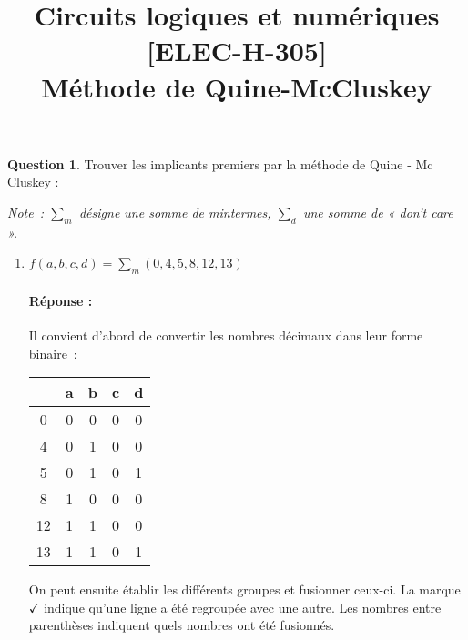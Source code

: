 \documentclass[11pt,a4paper]{article}
\date{}
\title{\vspace{-2cm}Circuits logiques et numériques [ELEC-H-305] \\  \tpnumber Méthode de Quine-McCluskey \ifthenelse{\boolean{corrige}}{-- Corrigé}{} \\ \small{\version}}
\theoremstyle{definition}%
\newtheorem{Q}{Question}[] %
\newcommand{\reponse}[1]{%
	\ifthenelse {\boolean{corrige}} {\paragraph{Réponse :} \color{darkblue}   #1\color{black}} {}
 }
\begin{document}
\maketitle
\vspace*{-1cm}




\begin{Q}
Trouver les implicants premiers par la méthode de Quine - Mc Cluskey :

\textit{Note~: $\sum_m$ désigne une somme de mintermes, $\sum_d$ une somme de « don't care ».}

\begin{enumerate}
	\item $f(a,b,c,d)=\sum_m(0,4,5,8,12,13)$
	\reponse{
		Il convient d'abord de convertir les nombres décimaux dans leur forme binaire~:
		\begin{center}
			\begin{tabular}{c|cccc}
			 & a & b & c & d \\ \hline
			 0 & 0 & 0 & 0 & 0 \\
			 4 & 0 & 1 & 0 & 0 \\
			 5 & 0 & 1 & 0 & 1 \\
			 8 & 1 & 0 & 0 & 0 \\
			 12 & 1 & 1 & 0 & 0 \\
			 13 & 1 & 1 & 0 & 1 \\
			\end{tabular}
		\end{center}

		On peut ensuite établir les différents groupes et fusionner ceux-ci.
		La marque $\checkmark$ indique qu'une ligne a été regroupée avec une autre.
		Les nombres entre parenthèses indiquent quels nombres ont été fusionnés.

}
\end{enumerate}
\end{Q}
\end{document}
